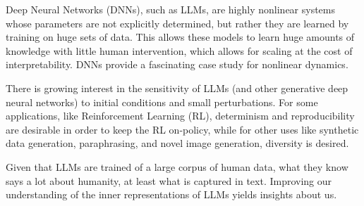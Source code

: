 \documentclass[a4paper,12pt]{article}
\begin{document}
Deep Neural Networks (DNNs), such as LLMs, are highly nonlinear systems whose parameters are not explicitly determined, but rather they are learned by training on huge sets of data.
This allows these models to learn huge amounts of knowledge with little human intervention, which allows for scaling at the cost of interpretability.
DNNs provide a fascinating case study for nonlinear dynamics.

There is growing interest in the sensitivity of LLMs (and other generative deep neural networks) to initial conditions and small perturbations. For some applications, like Reinforcement Learning (RL), determinism and reproducibility are desirable in order to keep the RL on-policy, while for other uses like synthetic data generation, paraphrasing, and novel image generation, diversity is desired.

Given that LLMs are trained of a large corpus of human data, what they know says a lot about humanity, at least what is captured in text. Improving our understanding of the inner representations of LLMs yields insights about us.

\end{document}
